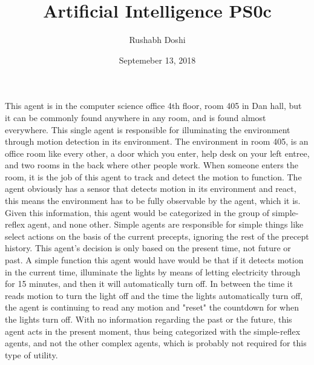 \documentclass[12pt]{article}
\date{Septemeber 13, 2018}
\title{Artificial Intelligence PS0c}
\author{Rushabh Doshi}
\begin{document}
\maketitle
\doublespace
This agent is in the computer science office 4th floor, room 405 in Dan hall, but it can be commonly found anywhere in any room, and is found almost everywhere. This single agent is responsible for illuminating the environment through motion detection in its environment. The environment in room 405, is an office room like every other, a door which you enter, help desk on your left entree, and two rooms in the back where other people work. When someone enters the room, it is the job of this agent to track and detect the motion to function. The agent obviously has a sensor that detects motion in its environment and react, this means the environment has to be fully observable by the agent, which it is. Given this information, this agent would be categorized in the group of simple-reflex agent, and none other. Simple agents are responsible for simple things like select actions on the basis of the current precepts, ignoring the rest of the precept history. This agent's decision is only based on the present time, not future or past. A simple function this agent would have would be that if it detects motion in the current time, illuminate the lights by means of letting electricity through for 15 minutes, and then it will automatically turn off. In between the time it reads motion to turn the light off and the time the lights automatically turn off, the agent is continuing to read any motion and "reset" the countdown for when the lights turn off. With no information regarding the past or the future, this agent acts in the present moment, thus being categorized with the simple-reflex agents, and not the other complex agents, which is probably not required for this type of utility. 
\end{document}
